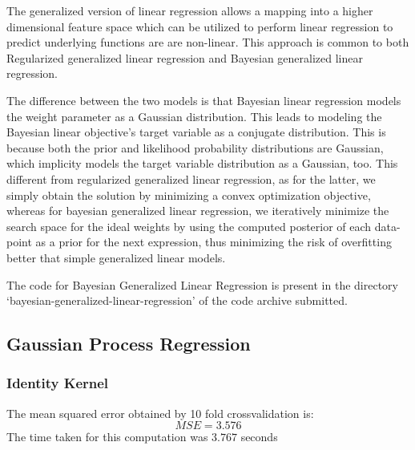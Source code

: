 \documentclass[parskip=full]{scrartcl}
\begin{document}
            The generalized version of linear regression allows a mapping into a higher dimensional feature space which can be utilized to perform linear regression to predict underlying functions are are non-linear. This approach is common to both Regularized generalized linear regression and Bayesian generalized linear regression.

            The difference between the two models is that Bayesian linear regression models the weight parameter as a Gaussian distribution. This leads to modeling the Bayesian linear objective's target variable as a conjugate distribution. This is because both the prior and likelihood probability distributions are Gaussian, which implicity models the target variable distribution as a Gaussian, too. This different from regularized generalized linear regression, as for the latter, we simply obtain the solution by minimizing a convex optimization objective, whereas for bayesian generalized linear regression, we iteratively minimize the search space for the ideal weights by using the computed posterior of each data-point as a prior for the next expression, thus minimizing the risk of overfitting better that simple generalized linear models.
        

        The code for Bayesian Generalized Linear Regression is present in the directory `bayesian-generalized-linear-regression' of the code archive submitted.
    

    \subsection{Gaussian Process Regression} %
    \label{sub:gaussian_process_regression}

        \subsubsection*{Identity Kernel} %
        \label{ssub:identity_kernel}

        The mean squared error obtained by 10 fold crossvalidation is:
        $$MSE = 3.576$$
        The time taken for this computation was $3.767$ seconds
        
\end{document}
